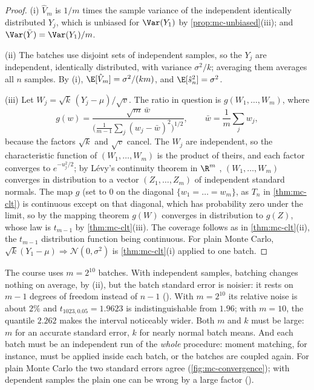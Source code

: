\begin{proof}
(i) $\hat V_m$ is $1/m$ times the sample variance of the independent identically
distributed $Y_j$, which is unbiased for $\Var(Y_1)$ by \cref{prop:mc-unbiased}(iii); and
$\Var(\bar Y)=\Var(Y_1)/m$.

(ii) The batches use disjoint sets of independent samples, so the $Y_j$ are independent,
identically distributed, with variance $\sigma^2/k$; averaging them averages all $n$
samples. By (i), $\E[\hat V_m]=\sigma^2/(km)$, and $\E[\hat s_n^2]=\sigma^2$.

(iii) Let $W_j=\sqrt k\,(Y_j-\mu)/\sqrt v$. The ratio in question is
$g(W_1,\dots,W_m)$, where
\[
  g(w)=\frac{\sqrt m\,\bar w}{\big(\frac1{m-1}\sum_j(w_j-\bar w)^2\big)^{1/2}},\qquad
  \bar w=\frac1m\sum_jw_j,
\]
because the factors $\sqrt k$ and $\sqrt v$ cancel. The $W_j$ are independent, so the
characteristic function of $(W_1,\dots,W_m)$ is the product of theirs, and each factor
converges to $e^{-u_j^2/2}$; by Lévy's continuity theorem in $\R^m$
\citep[Section~3.10]{durrett}, $(W_1,\dots,W_m)$ converges in distribution to a vector
$(Z_1,\dots,Z_m)$ of independent standard normals. The map $g$ (set to $0$ on the diagonal $\{w_1=\dots=w_m\}$, as $T_n$ in
\cref{thm:mc-clt}) is continuous except on that diagonal, which has probability zero under
the limit, so by the
mapping theorem \citep[Theorem~2.7]{billingsley} $g(W)$ converges in distribution to
$g(Z)$, whose law is $t_{m-1}$ by \cref{thm:mc-clt}(iii). The coverage follows as in
\cref{thm:mc-clt}(ii), the $t_{m-1}$ distribution function being continuous. For plain
Monte Carlo, $\sqrt k(Y_1-\mu)\Rightarrow\mathcal N(0,\sigma^2)$ is \cref{thm:mc-clt}(i)
applied to one batch.
\end{proof}

The course uses $m=2^{10}$ batches. With independent samples, batching changes nothing on
average, by (ii), but the batch standard error is noisier: it rests on $m-1$ degrees of
freedom instead of $n-1$ (). With $m=2^{10}$ its relative noise is
about $2\%$ and $t_{1023,0.05}=1.9623$ is indistinguishable from $1.96$; with $m=10$, the
quantile $2.262$ makes the interval noticeably wider. Both $m$ and $k$ must be large: $m$ for
an accurate standard error, $k$ for nearly normal batch means. And each batch must be an
independent run of the \emph{whole} procedure: moment matching, for instance, must be
applied inside each batch, or the batches are coupled again. For plain Monte Carlo the two
standard errors agree (\cref{fig:mc-convergence}); with dependent samples the plain one can
be wrong by a large factor ().


